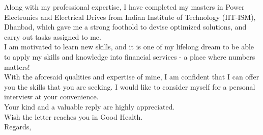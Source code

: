\documentclass[11pt, a4paper]{article}
\begin{document}
	Along with my professional expertise, I have completed my masters in Power Electronics and Electrical Drives from Indian Institute of Technology (IIT-ISM), Dhanbad, which gave me a strong foothold to devise optimized solutions, and carry out tasks assigned to me. \\[5pt]
	
	
	I am motivated to learn new skills, and it is one of my lifelong dream to be able to apply my skills and knowledge into financial services - a place where numbers matters! \\[5pt]
	
	With the aforesaid qualities and expertise of mine, I am confident that I can offer you the skills that you are seeking. I would like to consider myself for a personal interview at your convenience. \\[5pt]
	
	Your kind and a valuable reply are highly appreciated. \\[5pt]
	
	Wish the letter reaches you in Good Health. \\[7pt]
	
	Regards, \\ \AuthorFullName
\end{document}
